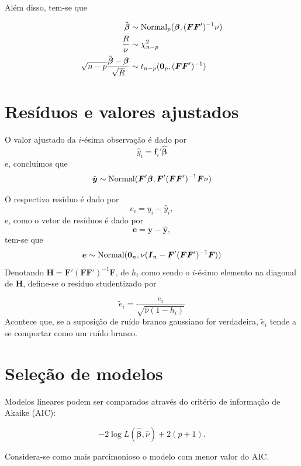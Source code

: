 \documentclass[
  letterpaper,
  DIV=11,
  numbers=noendperiod]{scrartcl}
\theoremstyle{definition}
\theoremstyle{definition}
\theoremstyle{plain}
\theoremstyle{plain}
\theoremstyle{remark}
\begin{document}
Além disso, tem-se que

\begin{align*}
     \hat{\boldsymbol{\beta}}&\sim\hbox{Normal}_p(\boldsymbol{\beta},(\boldsymbol{F}\boldsymbol{F}')^{-1}\nu)\\
     \frac{R}{\nu}&\sim\chi^2_{n-p}\\
     \sqrt{n-p}\frac{\hat{\boldsymbol{\beta}}-\boldsymbol{\beta}}{\sqrt{R}}&\sim t_{n-p}(\boldsymbol{0}_p, (\boldsymbol{F}\boldsymbol{F}')^{-1})
     \end{align*}

\section{Resíduos e valores
ajustados}\label{resuxedduos-e-valores-ajustados}

O valor ajustado da \(i\)-ésima observação é dado por \begin{equation}
        \hat{y}_i=\boldsymbol{f}_i' \hat{\boldsymbol{\beta}}
        \end{equation} e, concluímos que
\[\hat{\boldsymbol{y}}\sim \hbox{Normal}( \boldsymbol{F}'\boldsymbol{\beta}, \boldsymbol{F}'(\boldsymbol{F}\boldsymbol{F}')^{-1}\boldsymbol{F}\nu )\]

O respectivo resíduo é dado por \[e_i=y_i - \hat{y}_i,\] e, como o vetor
de resíduos é dado por
\[\boldsymbol{e}=\boldsymbol{y}-\hat{\boldsymbol{y}},\] tem-se que
\[\boldsymbol{e}\sim \hbox{Normal}(\boldsymbol{0}_n,\nu(\boldsymbol{I}_n-\boldsymbol{F}'(\boldsymbol{F}\boldsymbol{F}')^{-1}\boldsymbol{F}))\]
Denotando
\(\boldsymbol{H}=\boldsymbol{F}'(\boldsymbol{F}\boldsymbol{F}')^{-1}\boldsymbol{F}\),
de \(h_i\) como sendo o \(i\)-ésimo elemento na diagonal de
\(\boldsymbol{H}\), define-se o resíduo studentizado por

\[\tilde{e}_i=\frac{e_i}{\sqrt{\hat{\nu}(1-h_i)}}\] Acontece que, se a
suposição de ruído branco gaussiano for verdadeira, \(\tilde{e}_i\)
tende a se comportar como um ruído branco.

\section{Seleção de modelos}\label{seleuxe7uxe3o-de-modelos}

Modelos lineares podem ser comparados através do critério de informação
de Akaike (AIC):

\[-2\log L(\hat{\boldsymbol{\beta}},\hat{\nu}) + 2(p+1).\]

Considera-se como mais parcimonioso o modelo com menor valor do AIC.
\end{document}
